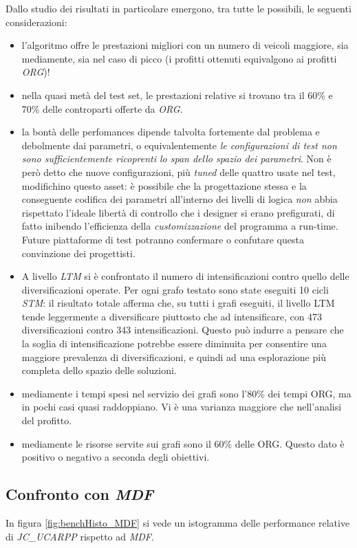 Dallo studio dei risultati in particolare emergono, tra tutte le possibili, le seguenti considerazioni:
\begin{itemize}
  \item l'algoritmo offre le prestazioni migliori con un numero di veicoli maggiore, sia mediamente, sia nel caso di picco (i profitti ottenuti equivalgono ai profitti \emph{ORG})!
  \item nella quasi metà del test set, le prestazioni relative si trovano tra il 60\% e 70\% delle controparti offerte da \emph{ORG}.
  \item la bontà delle perfomances dipende talvolta fortemente dal problema e debolmente dai parametri, o equivalentemente \emph{le configurazioni di test non sono sufficientemente 
  ricoprenti lo span dello spazio dei parametri}. Non è però detto che nuove configurazioni, più \emph{tuned} delle quattro usate nel test, modifichino questo asset: è possibile che la progettazione stessa
  e la conseguente codifica dei parametri all'interno dei livelli di logica \emph{non} abbia rispettato l'ideale libertà di controllo che i designer si erano prefigurati, di fatto
  inibendo l'efficienza della \emph{customizzazione} del programma a run-time. Future piattaforme di test potranno confermare o confutare questa convinzione dei progettisti.
  \item A livello \emph{LTM} si è confrontato il numero di intensificazioni contro quello delle diversificazioni operate. 
  		Per ogni grafo testato sono state eseguiti 10 cicli \emph{STM}: il risultato totale afferma che, su tutti i grafi eseguiti, il livello LTM tende leggermente a diversificare piuttosto che ad intensificare,
  		con 473 diversificazioni contro 343 intensificazioni. Questo può indurre a pensare che la soglia di intensificazione potrebbe essere diminuita per consentire una maggiore prevalenza di diversificazioni,
  		e quindi ad una esplorazione più completa dello spazio delle soluzioni.
  \item mediamente i tempi spesi nel servizio dei grafi sono l'$80\%$ dei tempi ORG, ma in pochi casi quasi raddoppiano. Vi è una varianza maggiore che nell'analisi del profitto.
  \item mediamente le risorse servite sui grafi sono il $60\%$ delle ORG. Questo dato è positivo o negativo a seconda degli obiettivi.
\end{itemize}

\subsection{Confronto con \emph{MDF}}
In figura \ref{fig:benchHisto_MDF} si vede un istogramma delle performance relative di \emph{JC\_UCARPP} rispetto ad \emph{MDF}. 

